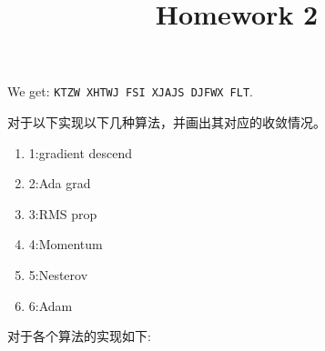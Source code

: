 \documentclass{homework}
\begin{document}


We get: \texttt{KTZW XHTWJ FSI XJAJS DJFWX FLT}.

\fi 


\title{ Homework 2}

\question 对于以下实现以下几种算法，并画出其对应的收敛情况。
\begin{enumerate}
	\item 1:gradient descend
	\item 2:Ada grad
	\item 3:RMS prop
	\item 4:Momentum
	\item 5:Nesterov
	\item[]  6:Adam
\end{enumerate}

对于各个算法的实现如下:







\end{document}
